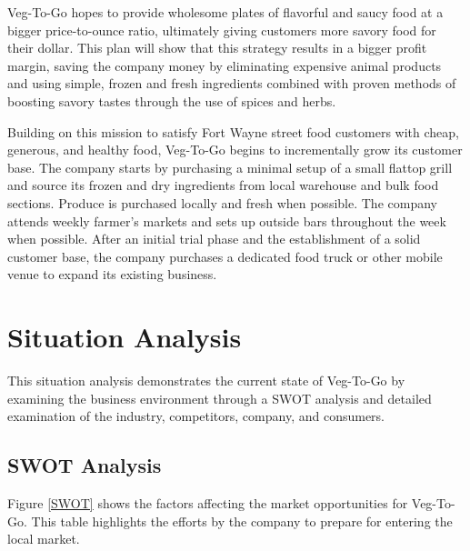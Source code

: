 \documentclass[12pt, letterpaper]{article}
\newcommand{\companyname}{Veg-To-Go}
\begin{document}
\companyname{} hopes to provide wholesome plates of flavorful and saucy food at a bigger price-to-ounce ratio, ultimately giving customers more savory food for their dollar.  This plan will show that this strategy results in a bigger profit margin, saving the company money by eliminating expensive animal products and using simple, frozen and fresh ingredients combined with proven methods of boosting savory tastes through the use of spices and herbs.

Building on this mission to satisfy Fort Wayne street food customers with cheap, generous, and healthy food, Veg-To-Go begins to incrementally grow its customer base.  The company starts by purchasing a minimal setup of a small flattop grill and source its frozen and dry ingredients from local warehouse and bulk food sections. Produce is purchased locally and fresh when possible.  The company attends weekly farmer's markets and sets up outside bars throughout the week when possible.  After an initial trial phase and the establishment of a solid customer base, the company purchases a dedicated food truck or other mobile venue to expand its existing business.

\newpage

\section{Situation Analysis}
This situation analysis demonstrates the current state of \companyname{} by examining the business environment through a SWOT analysis and detailed examination of the industry, competitors, company, and consumers.

\subsection{SWOT Analysis}
Figure \ref{SWOT} shows the factors affecting the market opportunities for \companyname{}.  This table highlights the efforts by the company to prepare for entering the local market.
\end{document}
